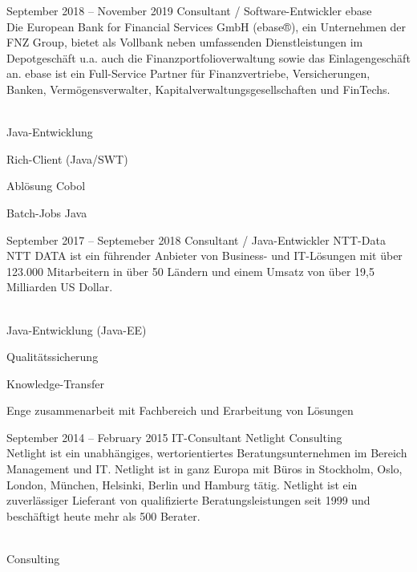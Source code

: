 \documentclass[fontsize=10pt]{tccv}
\begin{document}
\begin{eventlist}
\item{September 2018 -- November 2019}
     {Consultant / Software-Entwickler}
     {ebase}
\\
Die European Bank for Financial Services GmbH (ebase®), ein Unternehmen der FNZ
Group, bietet als Vollbank neben umfassenden Dienstleistungen im
Depotgeschäft u.a. auch die Finanzportfolioverwaltung sowie das
Einlagengeschäft an. ebase ist ein Full-Service Partner für
Finanzvertriebe, Versicherungen, Banken, Vermögensverwalter,
Kapitalverwaltungsgesellschaften und FinTechs.
\\\\
\begin{assignments}
\item{Java-Entwicklung}
\item{Rich-Client (Java/SWT)}
\item{Ablösung Cobol}
\item{Batch-Jobs Java}
\end{assignments}

\item{September 2017 -- Septemeber 2018}
     {Consultant / Java-Entwickler}
     {NTT-Data}
\\
NTT DATA ist ein führender Anbieter von Business- und IT-Lösungen mit über
123.000 Mitarbeitern in über 50 Ländern und einem Umsatz von über 19,5
Milliarden US Dollar.
\\\\
\begin{assignments}
\item{Java-Entwicklung (Java-EE)}
\item{Qualitätssicherung}
\item{Knowledge-Transfer}
\item{Enge zusammenarbeit mit Fachbereich und Erarbeitung von Lösungen}
\end{assignments}

\item{September 2014 -- February 2015}
     {IT-Consultant}
     {Netlight Consulting}
\\
Netlight ist ein unabhängiges, wertorientiertes Beratungsunternehmen im Bereich
Management und IT. Netlight ist in ganz Europa mit Büros in Stockholm,
Oslo, London, München, Helsinki, Berlin und Hamburg tätig. Netlight ist
ein zuverlässiger Lieferant von qualifizierte Beratungsleistungen seit
1999 und beschäftigt heute mehr als 500 Berater.
\\\\
\begin{assignments}
\item{Consulting}
\end{assignments}


\end{eventlist}
\end{document}
